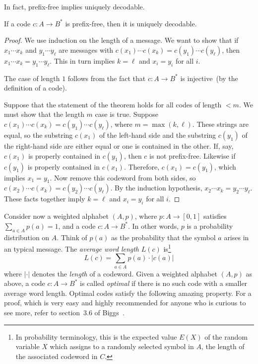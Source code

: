 In fact, prefix-free implies uniquely decodable.

\begin{theorem}
If a code $c: A \to B^*$ is prefix-free, then it is
uniquely decodable.
\end{theorem}

\begin{proof}
We use induction on the length of a message. We want to show that if
$x_1 \cdots x_k$ and $y_1 \cdots y_\ell$ are messages with
$c(x_1) \cdots c(x_k) = c(y_1) \cdots c(y_\ell)$, then
$x_1 \cdots x_k = y_1 \cdots y_\ell$. This in turn implies $k = \ell$
and $x_i = y_i$ for all $i$.

The case of length $1$ follows from the fact that
$c: A \to B^*$ is injective~(by the definition of a
code).

Suppose that the statement of the theorem holds for all
codes of length $< m$. We must show that the length $m$ case is
true. Suppose $c(x_1) \cdots c(x_k) = c(y_1) \cdots c(y_\ell)$, where
$m = \max(k, \ell)$. These strings are equal, so the substring
$c(x_1)$ of the left-hand side and the substring $c(y_1)$ of the
right-hand side are either equal or one is contained in the other. If,
say, $c(x_1)$ is properly contained in $c(y_1)$, then $c$ is not
prefix-free. Likewise if $c(y_1)$ is properly contained in
$c(x_1)$. Therefore, $c(x_1) = c(y_1)$, which implies $x_1 = y_1$. Now
remove this codeword from both sides, so
$c(x_2) \cdots c(x_k) = c(y_2) \cdots c(y_\ell)$. By the induction
hypothesis, $x_2 \cdots x_k = y_2 \cdots y_\ell$. These facts together
imply $k = \ell$ and $x_i = y_i$ for all $i$.
\end{proof}

Consider now a weighted alphabet $(A,p)$, where
$p: A \to [0,1]$ satisfies $\sum_{a \in A}p(a) = 1$, and a
code $c: A \to B^*$. In other words, $p$ is a probability
distribution on $A$. Think of $p(a)$ as the probability that the
symbol $a$ arises in an typical message. The
\emph{average word length} $L(c)$ is\footnote{
  In probability terminology, this is the expected value $E(X)$ of the
  random variable $X$ which assigns to a randomly selected symbol in
  $A$, the length of the associated codeword in $C$.
}
\[
L(c)
=
\sum_{a \in A} p(a) \cdot |c(a)|
\]
where $|\cdot|$ denotes the \emph{length} of a codeword.
Given a weighted alphabet $(A,p)$ as above, a code
$c: A \to B^*$ is called \emph{optimal} if there is no
such code with a smaller average word length.
Optimal codes satisfy the following amazing property. For a proof,
which is very easy and highly recommended for anyone who is curious to
see more, refer to section~3.6 of Biggs~\cite{Biggs2009}.

